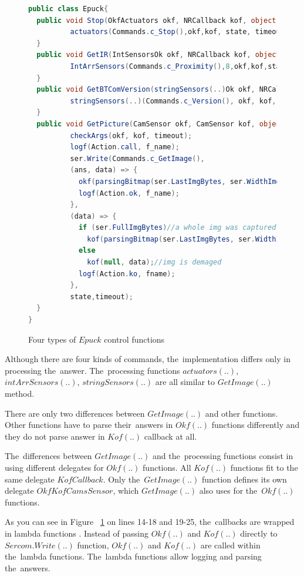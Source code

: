 \begin{figure}[!hbp]
\begin{lstlisting}[language=cs]
public class Epuck{
  public void Stop(OkfActuators okf, NRCallback kof, object state, double timeout) {
          actuators(Commands.c_Stop(),okf,kof, state, timeout, "Stop(..)");
  }
  public void GetIR(IntSensorsOk okf, NRCallback kof, object state, double timeout) {
          IntArrSensors(Commands.c_Proximity(),8,okf,kof,state,timeout,"GetIR(..)");
  }
  public void GetBTComVersion(stringSensors(..)Ok okf, NRCallback kof, object state, double timeout) {
          stringSensors(..)(Commands.c_Version(), okf, kof, state, timeout, "BTComVersion(..)");
  }
  public void GetPicture(CamSensor okf, CamSensor kof, object state, double timeout) {
          checkArgs(okf, kof, timeout);
          logf(Action.call, f_name);
          ser.Write(Commands.c_GetImage(),
          (ans, data) => {
            okf(parsingBitmap(ser.LastImgBytes, ser.WidthImg, ser.HeightImg, ser.ModeImg), data);
            logf(Action.ok, f_name);
          },
          (data) => {
            if (ser.FullImgBytes)//a whole img was captured
              kof(parsingBitmap(ser.LastImgBytes, ser.WidthImg, ser.HeightImg, ser.ModeImg), data);
            else
              kof(null, data);//img is demaged
            logf(Action.ko, fname);
          },
          state,timeout);		
  }	   
}
\end{lstlisting}
\caption{Four types of $Epuck$ control functions}
\label{publicep}	
\end{figure}

  Although there are four kinds of commands, the~implementation differs only in processing the~answer.
  The~processing functions $actuators(..)$, $intArrSensors(..)$, $stringSensors(..)$ are all similar to $GetImage(..)$ method.
  
  There are only two differences between $GetImage(..)$ and other functions.
  Other functions have to parse their~answers in $Okf(..)$ functions differently and they do not parse
  answer in $Kof(..)$ callback at all.

  The~differences between $GetImage(..)$ and the~processing functions consist in using different
  delegates for $Okf(..)$ functions. All $Kof(..)$ functions fit to the same delegate $KofCallback$. 
  Only the~$GetImage(..)$ function defines its own delegate $OkfKofCamsSensor$, 
  which $GetImage(..)$ also uses for the~$Okf(..)$ functions.
  
  \begin{remark}
  As you can see in Figure ~\ref{publicep} on lines 14-18 and 19-25,
  the~callbacks are wrapped in lambda functions \cite{lambda}.
  Instead of passing $Okf(..)$ and $Kof(..)$ directly to $Sercom.Write(..)$ function,
  $Okf(..)$ and $Kof(..)$  are called within the~lambda functions.
  The~lambda functions allow logging and parsing the~answers.
  \end{remark}

